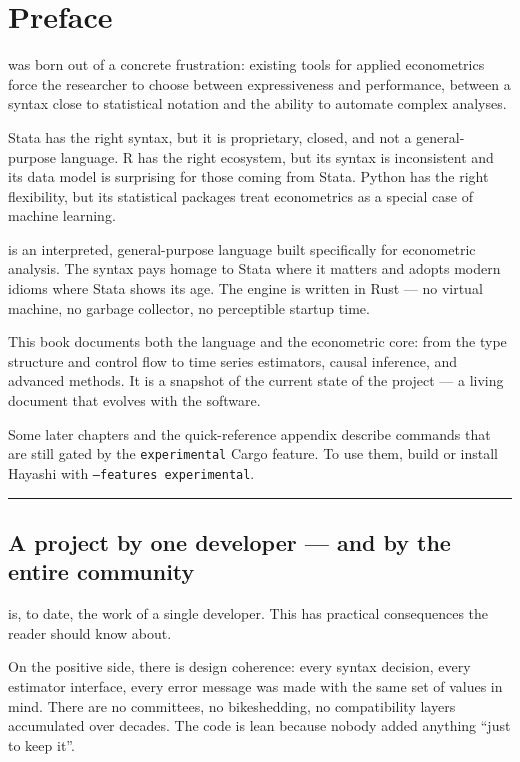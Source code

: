 \chapter*{Preface}

\hayashi{} was born out of a concrete frustration: existing tools for applied
econometrics force the researcher to choose between expressiveness and
performance, between a syntax close to statistical notation and the ability
to automate complex analyses.

Stata has the right syntax, but it is proprietary, closed, and not a
general-purpose language. R has the right ecosystem, but its syntax is
inconsistent and its data model is surprising for those coming from Stata.
Python has the right flexibility, but its statistical packages treat
econometrics as a special case of machine learning.

\hayashi{} is an interpreted, general-purpose language built specifically
for econometric analysis. The syntax pays homage to Stata where it matters
and adopts modern idioms where Stata shows its age. The engine is written
in Rust — no virtual machine, no garbage collector, no perceptible startup
time.

\bigskip

This book documents both the language and the econometric core: from the
type structure and control flow to time series estimators, causal inference,
and advanced methods. It is a snapshot of the current state of the project
— a living document that evolves with the software.

Some later chapters and the quick-reference appendix describe
commands that are still gated by the \texttt{experimental} Cargo feature.
To use them, build or install Hayashi with \texttt{--features experimental}.

\bigskip
\noindent\rule{\textwidth}{0.4pt}
\bigskip

\section*{A project by one developer — and by the entire community}

\hayashi{} is, to date, the work of a single developer. This has practical
consequences the reader should know about.

On the positive side, there is design coherence: every syntax decision,
every estimator interface, every error message was made with the same set
of values in mind. There are no committees, no bikeshedding, no
compatibility layers accumulated over decades. The code is lean because
nobody added anything ``just to keep it''.


